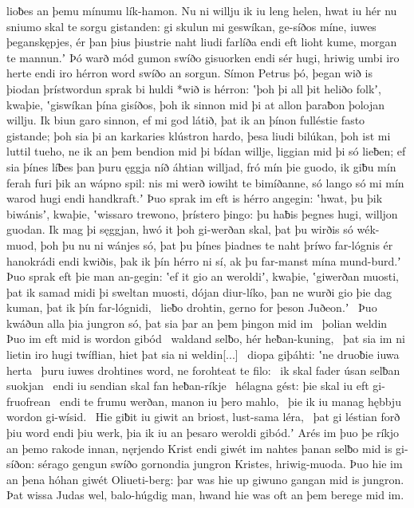 lioƀes an þemu mínumu lík-hamon. Nu ni willju ik iu leng helen,
hwat iu hér nu sniumo skal te sorgu gistanden:
gi skulun mi geswíkan, ge-síðos míne,
iuwes þeganskępjes, ér þan þius þiustrie naht
liudi farlíða endi eft lioht kume,
morgan te mannun.ʼ Þó warð mód gumon
swíðo gisuorken endi sér hugi,
hriwig umbi iro herte endi iro hérron word
swíðo an sorgun. Símon Petrus þó,
þegan wið is þiodan þrístwordun sprak
bi huldi *wið is hérron: ʽþoh þi all þit heliðo folkʼ, kwaþie,
ʽgiswíkan þína gisíðos, þoh ik sinnon mid þi
at allon þaraƀon þolojan willju.
Ik biun garo sinnon, ef mi god látið,
þat ik an þínon fulléstie fasto gistande;
þoh sia þi an karkaries klústron hardo,
þesa liudi bilúkan, þoh ist mi luttil tueho,
ne ik an þem bendion mid þi bídan willje,
liggian mid þi só lieƀen; ef sia þínes líƀes þan
þuru ęggja níð áhtian willjad,
fró mín þie guodo, ik giƀu mín ferah furi þik
an wápno spil: nis mi werð iowiht
te bimíðanne, só lango só mi mín warod
hugi endi handkraft.ʼ Þuo sprak im eft is hérro angegin:
ʽhwat, þu þik biwánisʼ, kwaþie, ʽwissaro trewono,
þrístero þingo: þu haƀis þegnes hugi,
willjon guodan. Ik mag þi sęggjan, hwó it þoh gi-werðan skal,
þat þu wirðis só wék-muod, þoh þu nu ni wánjes só,
þat þu þínes þiadnes te naht þríwo far-lógnis
ér hanokrádi endi kwiðis, þak ik þín hérro ni sí,
ak þu far-manst mína mund-burd.ʼ Þuo sprak eft þie man an-gegin:
ʽef it gio an weroldiʼ, kwaþie, ʽgiwerðan muosti,
þat ik samad midi þi sweltan muosti,
dójan diur-líko, þan ne wurði gio þie dag kuman,
þat ik þín far-lógnidi, \hld\ lieƀo drohtin,
gerno for þeson Juðeon.ʼ \hld\ Þuo kwáðun alla þia jungron só,
þat sia þar an þem þingon mid im \hld\ þolian weldin
Þuo im eft mid is wordon gibód \hld\ waldand selƀo,
hér heƀan-kuning, \hld\ þat sia im ni lietin iro hugi twíflian,
hiet þat sia ni weldin[...] \hld\ diopa giþáhti:
ʽne druoƀie iuwa herta \hld\ þuru iuwes drohtines word,
ne forohteat te filo: \hld\ ik skal fader úsan
selƀan suokjan \hld\ endi iu sendian skal
fan heƀan-ríkje \hld\ hélagna gést:
þie skal iu eft gi-fruofrean \hld\ endi te frumu werðan,
manon iu þero mahlo, \hld\ þie ik iu manag hębbju
wordon gi-wísid. \hld\ Hie giƀit iu giwit an briost,
lust-sama léra, \hld\ þat gi léstian forð
þiu word endi þiu werk, þia ik iu an þesaro weroldi gibód.ʼ
Arés im þuo þe ríkjo an þemo rakode innan,
nęrjendo Krist endi giwét im nahtes þanan
selƀo mid is gi-síðon: sérago gengun
swíðo gornondia jungron Kristes,
hriwig-muoda. Þuo hie im an þena hóhan giwét
Oliueti-berg: þar was hie up giwuno
gangan mid is jungron. Þat wissa Judas wel,
balo-húgdig man, hwand hie was oft an þem berege mid im.
